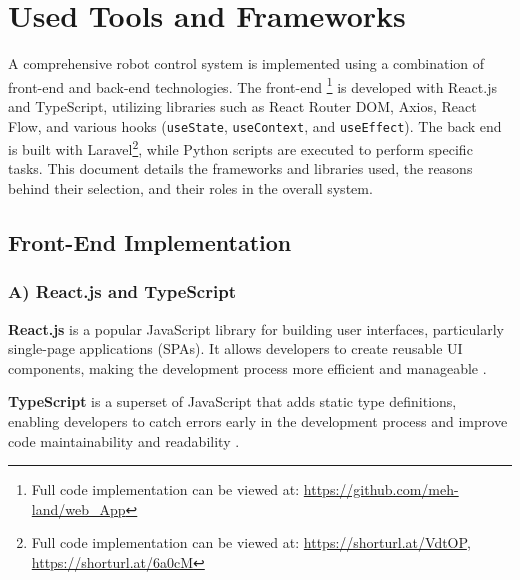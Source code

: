 \newpage
\section{Used Tools and Frameworks} %
A comprehensive robot control system is implemented using a combination of front-end  and back-end  technologies. The front-end \footnote{Full code implementation can be viewed at: \url{https://github.com/meh-land/web\_App}} is developed with React.js and TypeScript, utilizing libraries such as React Router DOM, Axios, React Flow, and various hooks (\texttt{useState}, \texttt{useContext}, and \texttt{useEffect}). The back end is built with Laravel\footnote{Full code implementation can be viewed at: \url{https://shorturl.at/VdtOP}, \url{https://shorturl.at/6a0cM}}, while Python scripts are executed to perform specific tasks. This document details the frameworks and libraries used, the reasons behind their selection, and their roles in the overall system.

\subsection{Front-End Implementation}
\subsubsection{A) React.js and TypeScript}

\textbf{React.js} is a popular JavaScript library for building user interfaces, particularly single-page applications (SPAs). It allows developers to create reusable UI components, making the development process more efficient and manageable \cite{reactjs}. 

\textbf{TypeScript} is a superset of JavaScript that adds static type definitions, enabling developers to catch errors early in the development process and improve code maintainability and readability \cite{reactTS}.


